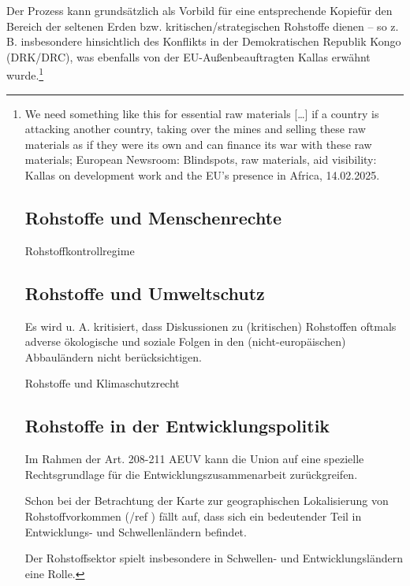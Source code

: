 \documentclass[12pt,a4paper,oneside]{book} %
\begin{document}
	
	Der Prozess kann grundsätzlich als Vorbild für eine entsprechende \glqq Kopie\grqq für den Bereich der seltenen Erden bzw. kritischen/strategischen Rohstoffe dienen -- so z. B. insbesondere hinsichtlich des Konflikts in der Demokratischen Republik Kongo (DRK/DRC), was ebenfalls von der EU-Außenbeauftragten Kallas erwähnt wurde.\footnote{\glqq We need something like this for essential raw materials […] if a country is attacking another country, taking over the mines and selling these raw materials as if they were its own and can finance its war with these raw materials\grqq; European Newsroom: Blindspots, raw materials, aid visibility: Kallas on development work and the EU’s presence in Africa, 14.02.2025. %
	
	
		
	
	\section{Rohstoffe und Menschenrechte}
	
	Rohstoffkontrollregime
	
	\section{Rohstoffe und Umweltschutz}
	
	Es wird u. A. kritisiert, dass Diskussionen zu (kritischen) Rohstoffen oftmals adverse ökologische und soziale Folgen in den (nicht-europäischen) Abbauländern nicht berücksichtigen.\autocite[15]{Kueblboeck_2023}
	
	Rohstoffe und Klimaschutzrecht
	
	
	\section{Rohstoffe in der Entwicklungspolitik}
	
	Im Rahmen der Art. 208-211 AEUV kann die Union auf eine spezielle Rechtsgrundlage für die Entwicklungszusammenarbeit zurückgreifen.
	
	Schon bei der Betrachtung der Karte zur geographischen Lokalisierung von Rohstoffvorkommen (/ref ) fällt auf, dass sich ein bedeutender Teil in Entwicklungs- und Schwellenländern befindet.
	
	Der Rohstoffsektor spielt insbesondere in Schwellen- und Entwicklungsländern eine Rolle.
	
}
\end{document}
